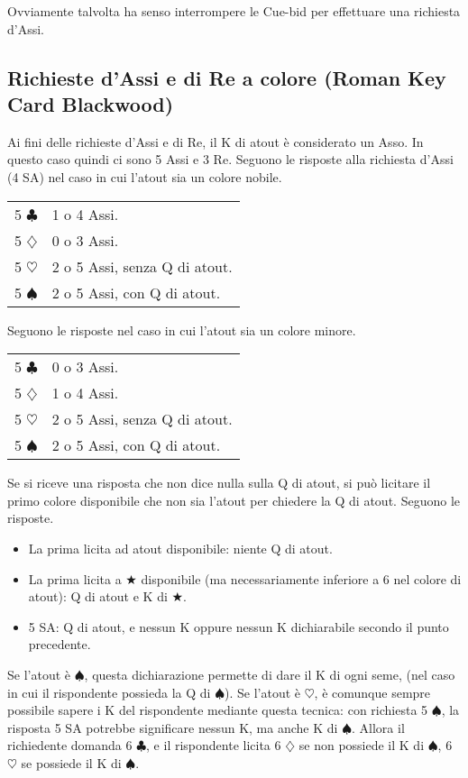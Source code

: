 \documentclass[a4paper,10pt]{article}
\renewcommand{\c}{$\clubsuit$\xspace}
\renewcommand{\d}{$\diamondsuit$\xspace}
\newcommand{\h}{$\heartsuit$\xspace}
\newcommand{\s}{$\spadesuit$\xspace}
\renewcommand{\j}{$\bigstar$\xspace}
\newcommand{\sa}{SA\xspace}
\newcommand{\smallspace}{\vskip0.3cm}
\newenvironment{twocol}
  {\smallspace\noindent\begin{tabular}{l p{0.78\textwidth}}}
  {\end{tabular}\smallspace}
\begin{document}
Ovviamente talvolta ha senso interrompere le Cue-bid per effettuare una richiesta d'Assi.


\subsection{Richieste d'Assi e di Re a colore (Roman Key Card Blackwood)}

Ai fini delle richieste d'Assi e di Re, il K di atout è considerato un Asso. In questo caso quindi ci sono 5 Assi e 3 Re. Seguono le risposte alla richiesta d'Assi (4 \sa) nel caso in cui l'atout sia un colore nobile.
\begin{twocol}
5 \c & 1 o 4 Assi.\\
5 \d & 0 o 3 Assi.\\
5 \h & 2 o 5 Assi, senza Q di atout.\\
5 \s & 2 o 5 Assi, con Q di atout.\\
\end{twocol}
\noindent Seguono le risposte nel caso in cui l'atout sia un colore minore.
\begin{twocol}
5 \c & 0 o 3 Assi.\\
5 \d & 1 o 4 Assi.\\
5 \h & 2 o 5 Assi, senza Q di atout.\\
5 \s & 2 o 5 Assi, con Q di atout.\\
\end{twocol}

\noindent Se si riceve una risposta che non dice nulla sulla Q di atout, si può licitare il primo colore disponibile che non sia l'atout per chiedere la Q di atout. Seguono le risposte.

\begin{itemize}
 \item La prima licita ad atout disponibile: niente Q di atout.
 \item La prima licita a \j disponibile (ma necessariamente inferiore a 6 nel colore di atout): Q di atout e K di \j.
 \item 5 \sa: Q di atout, e nessun K oppure nessun K dichiarabile secondo il punto precedente.
\end{itemize}

Se l'atout è \s, questa dichiarazione permette di dare il K di ogni seme, (nel caso in cui il rispondente possieda la Q di \s). Se l'atout è \h, è comunque sempre possibile sapere i K del rispondente mediante questa tecnica: con richiesta 5 \s, la risposta 5 \sa potrebbe significare nessun K, ma anche K di \s.
Allora il richiedente domanda 6 \c, e il rispondente licita 6 \d se non possiede il K di \s, 6 \h se possiede il K di \s.
\end{document}
